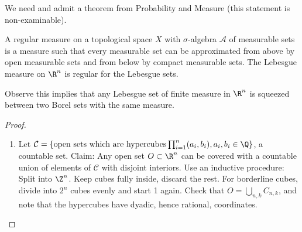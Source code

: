 \documentclass{article}
\begin{document}
We need and admit a theorem from Probability and Measure (this statement is non-examinable).
\begin{thm}
    A regular measure on a topological space $X$ with $\sigma$-algebra $\mathscr{A}$ of measurable sets is a measure such that every measurable set can be approximated from above by open measurable sets and from below by compact measurable sets.
    The Lebesgue measure on $\R^n$ is regular for the Lebesgue sets.
\end{thm}
Observe this implies that any Lebesgue set of finite measure in $\R^n$ is squeezed between two Borel sets with the same measure.
\begin{proof}
    \leavevmode
    \begin{enumerate}[label=(\arabic*)]
        \item Let $\mathcal{C} = \{\text{open sets which are hypercubes} \prod_{i=1}^n (a_i, b_i), a_i, b_i \in \Q\}$, a countable set.
            Claim: Any open set $O \subset \R^n$ can be covered with a countable union of elements of $\mathcal{C}$ with disjoint interiors.
            Use an inductive procedure: Split into $\Z^n$. Keep cubes fully inside, discard the rest. For borderline cubes, divide into $2^n$ cubes evenly and start 1 again.
            Check that $O = \bigcup_{n, k} C_{n, k}$, and note that the hypercubes have dyadic, hence rational, coordinates.
            \begin{center}
            \end{center}
    \end{enumerate}
\end{proof}
\end{document}
